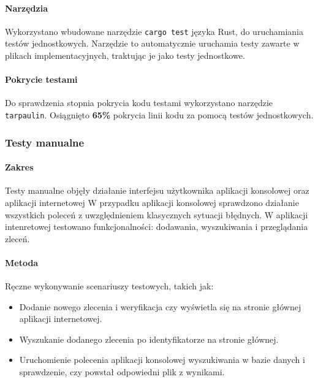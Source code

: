             \paragraph{Narzędzia}  
            Wykorzystano wbudowane narzędzie \texttt{cargo test} języka Rust, do uruchamiania testów jednostkowych. Narzędzie to automatycznie uruchamia testy zawarte w plikach implementacyjnych, traktując je jako testy jednostkowe.

            \paragraph{Pokrycie testami}
            Do sprawdzenia stopnia pokrycia kodu testami wykorzystano narzędzie \texttt{tarpaulin}\cite{Rust:tarpaulin}. 
            Osiągnięto \textbf{65\%} pokrycia linii kodu za pomocą testów jednostkowych.

        \subsubsection{Testy manualne}
        
            \paragraph{Zakres}
            Testy manualne objęły działanie interfejsu użytkownika aplikacji konsolowej oraz aplikacji internetowej W przypadku aplikacji konsolowej sprawdzono działanie wszystkich poleceń z uwzględnieniem klasycznych sytuacji błędnych. W aplikacji intenretowej testowano funkcjonalności: dodawania, wyszukiwania i przeglądania zleceń.

            \paragraph{Metoda}
            Ręczne wykonywanie scenariuszy testowych, takich jak:
            \begin{itemize}
                \item {Dodanie nowego zlecenia i weryfikacja czy wyświetla się na stronie głównej aplikacji internetowej.}
                \item {Wyszukanie dodanego zlecenia po identyfikatorze na stronie głównej.}
                \item {Uruchomienie polecenia aplikacji konsolowej wyszukiwania w bazie danych i sprawdzenie, czy powstał odpowiedni plik z wynikami.}
            \end{itemize}